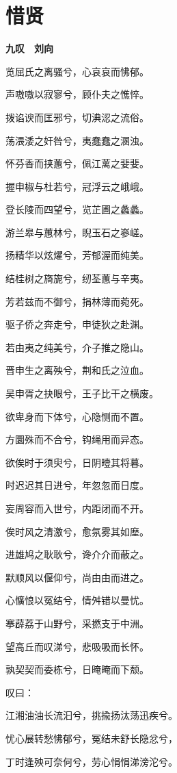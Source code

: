\documentclass[12pt,a4paper]{ctexbook}
\begin{document}
\section{惜贤}
\textbf{九叹　刘向}\par\vspace{0.5em}
览屈氏之离骚兮，心哀哀而怫郁。\par
声嗷嗷以寂寥兮，顾仆夫之憔悴。\par
拨谄谀而匡邪兮，切淟涊之流俗。\par
荡渨涹之奸咎兮，夷蠢蠢之溷浊。\par
怀芬香而挟蕙兮，佩江蓠之婓婓。\par
握申椒与杜若兮，冠浮云之峨峨。\par
登长陵而四望兮，览芷圃之蠡蠡。\par
游兰皋与蕙林兮，睨玉石之嵾嵯。\par
扬精华以炫燿兮，芳郁渥而纯美。\par
结桂树之旖旎兮，纫荃蕙与辛夷。\par
芳若兹而不御兮，捐林薄而菀死。\par
驱子侨之奔走兮，申徒狄之赴渊。\par
若由夷之纯美兮，介子推之隐山。\par
晋申生之离殃兮，荆和氏之泣血。\par
吴申胥之抉眼兮，王子比干之横废。\par
欲卑身而下体兮，心隐恻而不置。\par
方圜殊而不合兮，钩绳用而异态。\par
欲俟时于须臾兮，日阴曀其将暮。\par
时迟迟其日进兮，年忽忽而日度。\par
妄周容而入世兮，内距闭而不开。\par
俟时风之清激兮，愈氛雾其如塺。\par
进雄鸠之耿耿兮，谗介介而蔽之。\par
默顺风以偃仰兮，尚由由而进之。\par
心懭悢以冤结兮，情舛错以曼忧。\par
搴薜荔于山野兮，采撚支于中洲。\par
望高丘而叹涕兮，悲吸吸而长怀。\par
孰契契而委栋兮，日晻晻而下颓。\par
叹曰：\par
江湘油油长流汩兮，挑揄扬汰荡迅疾兮。\par
忧心展转愁怫郁兮，冤结未舒长隐忿兮，\par
丁时逢殃可奈何兮，劳心悁悁涕滂沱兮。\par
\end{document}
